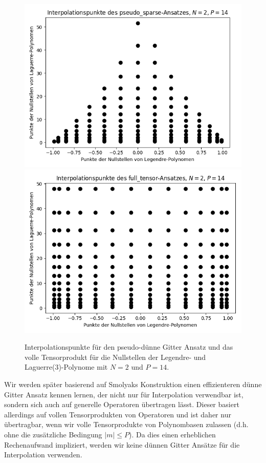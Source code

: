 \begin{figure}[!htb]
\centering
{}
  \includegraphics[width=\linewidth]{Figures/roots_pseudo_sparse.png}
\endminipage
{}
  \includegraphics[width=\linewidth]{Figures/roots_full_tensor.png}
\endminipage
\caption{Interpolationspunkte für den pseudo-dünne Gitter Ansatz und das volle Tensorprodukt für die Nullstellen der Legendre- und Laguerre(3)-Polynome mit $N=2$ und $P=14$.}
\label{fig:roots_two_dim}
\end{figure}

Wir werden später basierend auf Smolyaks Konstruktion einen effizienteren dünne Gitter Ansatz kennen lernen, der nicht nur für Interpolation verwendbar ist, sondern sich auch auf generelle Operatoren übertragen lässt. Dieser basiert allerdings auf vollen Tensorprodukten von Operatoren und ist daher nur übertragbar, wenn wir volle Tensorprodukte von Polynombasen zulassen (d.h. ohne die zusätzliche Bedingung $|m|\le P$). Da dies einen erheblichen Rechenaufwand impliziert, werden wir keine dünnen Gitter Ansätze für die Interpolation verwenden.
